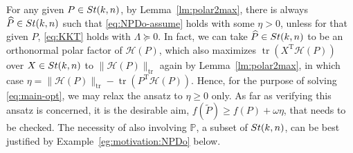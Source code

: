 \documentclass[11pt]{article}
\def\bbP{\mathbb{P}}
\def\scrH{\mathscr{H}}
\def\wtd{\widetilde}
\def\what{\widehat}
\newcommand\STM[2]{{\rm St}(#1,#2)}
\DeclareMathOperator{\tr}{tr}
\DeclareMathOperator{\T}{T}
\theoremstyle{definition}
\numberwithin{equation}{section}
\begin{document}
\smallskip
For any given $P\in\STM{k}{n}$, by Lemma~\ref{lm:polar2max}, there is always
$\what P\in\STM{k}{n}$ such that \eqref{eq:NPDo-assume} holds with some $\eta>0$, unless for that given $P$,
\eqref{eq:KKT} holds with $\Lambda\succeq 0$. In fact, we can take
$\what P\in\STM{k}{n}$ to be an orthonormal polar factor of $\scrH(P)$, which also maximizes
$\tr(X^{\T}\scrH(P))$ over $X\in\STM{k}{n}$ to $\|\scrH(P)\|_{\tr}$  again by Lemma~\ref{lm:polar2max}, in which
case $\eta=\|\scrH(P)\|_{\tr}-\tr(P^{\T}\scrH(P))$.
Hence, for the purpose of solving \eqref{eq:main-opt},
we may relax the ansatz to $\eta\ge 0$ only.
As far as verifying this ansatz is concerned, it is the desirable aim, $f(\wtd P)\ge f(P)+\omega\eta$,
that  needs to be checked.
The necessity of also involving $\bbP$, a subset of $\STM{k}{n}$, can be best justified by Example~\ref{eg:motivation:NPDo} below.
\end{document}
